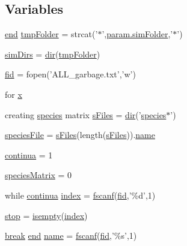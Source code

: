 \subsection*{Variables}
\begin{DoxyCompactItemize}
\item 
\hyperlink{a00019_afb358f48b1646c750fb9da6c6585be2b}{end} \hyperlink{a00021_ad509473eed851f9f5ff4157c02ec8618}{tmp\-Folder} = strcat('$\ast$',\hyperlink{a00026_aa671e3345005bd599e662bcaa115b18a}{param.\-sim\-Folder},'$\ast$')
\item 
\hyperlink{a00021_aae5035eb84b89176ed5b06e136325eff}{sim\-Dirs} = \hyperlink{a00065_a4ca269cf93df1b512b52174c1a256fe5}{dir}(\hyperlink{a00023_ad509473eed851f9f5ff4157c02ec8618}{tmp\-Folder})
\item 
\hyperlink{a00021_ae9011d40c6f13e68e6f07156e0da7c5d}{fid} = fopen('A\-L\-L\-\_\-garbage.\-txt','w')
\item 
for \hyperlink{a00021_a7265972fe485274cfff77a9bb07b8fce}{x}
\item 
creating \hyperlink{a00016}{species} matrix \hyperlink{a00021_a0cf551ea63e8b67362ae2ab776072d1f}{s\-Files} = \hyperlink{a00065_a4ca269cf93df1b512b52174c1a256fe5}{dir}('\hyperlink{a00016}{species}$\ast$')
\item 
\hyperlink{a00021_a7da0c82834970c5f3c3d9224ab832577}{species\-File} = \hyperlink{a00021_a0cf551ea63e8b67362ae2ab776072d1f}{s\-Files}(length(\hyperlink{a00021_a0cf551ea63e8b67362ae2ab776072d1f}{s\-Files})).\hyperlink{a00021_abbf559a76fab59203496b0847ab9502a}{name}
\item 
\hyperlink{a00021_a9c951ebd5bc3f1adce943bee1255f4d6}{continua} = 1
\item 
\hyperlink{a00021_aaeeccb9f4fc7b14ac6b4810a4bf9f71e}{species\-Matrix} = 0
\item 
while \hyperlink{a00024_a9c951ebd5bc3f1adce943bee1255f4d6}{continua} \hyperlink{a00021_a0cd6a44ffb07342cbc7e5ac33bfc9495}{index} = \hyperlink{a00019_a028ac102a731e62fb0a7439381f566c1}{fscanf}(\hyperlink{a00025_ae9011d40c6f13e68e6f07156e0da7c5d}{fid},'\%d',1)
\item 
\hyperlink{a00021_a6bd08e37edf4151f5f6d1fc27a6f227a}{stop} = \hyperlink{a00019_ac10445404f4b83302522defb59e25ef7}{isempty}(\hyperlink{a00054_a0cd6a44ffb07342cbc7e5ac33bfc9495}{index})
\item 
\hyperlink{a00023_a91cf6fbebedd86150a36e5ac3d5d3bfc}{break} \hyperlink{a00019_afb358f48b1646c750fb9da6c6585be2b}{end} \hyperlink{a00021_abbf559a76fab59203496b0847ab9502a}{name} = \hyperlink{a00019_a028ac102a731e62fb0a7439381f566c1}{fscanf}(\hyperlink{a00025_ae9011d40c6f13e68e6f07156e0da7c5d}{fid},'\%s',1)

\end{DoxyCompactItemize}
